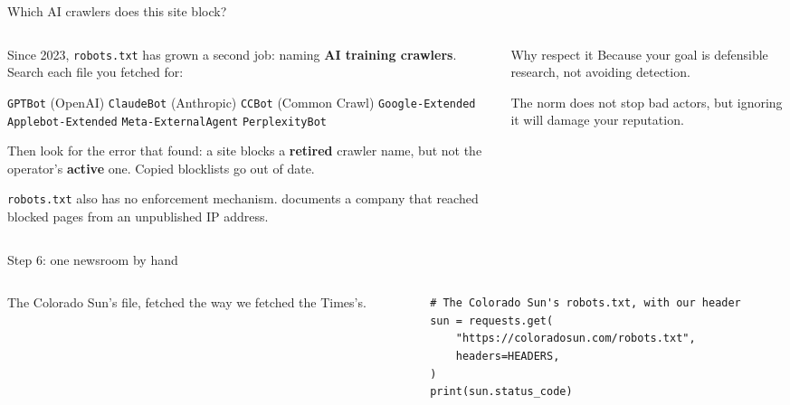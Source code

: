 \documentclass[9pt,aspectratio=169]{beamer}
\begin{document}
\begin{frame}{Which AI crawlers does this site block?}
    \begin{columns}[T]
        \begin{column}{0.6\textwidth}
            Since 2023, \texttt{robots.txt} has grown a second job: naming \textbf{AI training crawlers}. Search each file you fetched for:

            \smallskip
            {\footnotesize \texttt{GPTBot} (OpenAI) \textbar{} \texttt{ClaudeBot} (Anthropic) \textbar{} \texttt{CCBot} (Common Crawl) \textbar{} \texttt{Google-Extended} \textbar{} \texttt{Applebot-Extended} \textbar{} \texttt{Meta-ExternalAgent} \textbar{} \texttt{PerplexityBot}}

            \medskip

            Then look for the error that \textcite{koebler_wrong_2024} found: a site blocks a \textbf{retired} crawler name, but not the operator's \textbf{active} one. Copied blocklists go out of date.

            \medskip

            \texttt{robots.txt} also has no enforcement mechanism. \textcite{mehrotra_perplexity_2024} documents a company that reached blocked pages from an unpublished IP address.
        \end{column}
        \begin{column}{0.35\textwidth}
            \begin{alertblock}{Why respect it}
                \footnotesize Because your goal is defensible research, not avoiding detection.

                \smallskip

                The norm does not stop bad actors, but ignoring it will damage your reputation.
            \end{alertblock}
        \end{column}
    \end{columns}
\end{frame}

\begin{frame}[fragile]{Step 6: one newsroom by hand}
    \begin{columns}[T]
        \begin{column}{0.37\textwidth}
            The Colorado Sun's file, fetched the way we fetched the Times's.
        \end{column}
        \begin{column}{0.6\textwidth}
\begin{lstlisting}[basicstyle=\ttfamily\footnotesize]
# The Colorado Sun's robots.txt, with our header
sun = requests.get(
    "https://coloradosun.com/robots.txt",
    headers=HEADERS,
)
print(sun.status_code)
\end{lstlisting}
        \end{column}
    \end{columns}
\end{frame}
\end{document}
